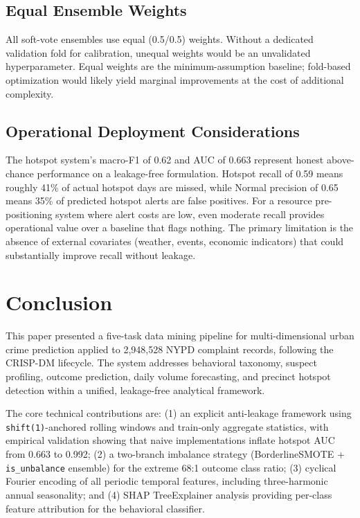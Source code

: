 \documentclass[conference]{IEEEtran}
\begin{document}
\subsection{Equal Ensemble Weights}

All soft-vote ensembles use equal (0.5/0.5) weights. Without a dedicated validation fold for calibration, unequal weights would be an unvalidated hyperparameter. Equal weights are the minimum-assumption baseline; fold-based optimization would likely yield marginal improvements at the cost of additional complexity.

\subsection{Operational Deployment Considerations}

The hotspot system's macro-F1 of 0.62 and AUC of 0.663 represent honest above-chance performance on a leakage-free formulation. Hotspot recall of 0.59 means roughly 41\% of actual hotspot days are missed, while Normal precision of 0.65 means 35\% of predicted hotspot alerts are false positives. For a resource pre-positioning system where alert costs are low, even moderate recall provides operational value over a baseline that flags nothing. The primary limitation is the absence of external covariates (weather, events, economic indicators) that could substantially improve recall without leakage.

\section{Conclusion}
\label{sec:conclusion}

This paper presented a five-task data mining pipeline for multi-dimensional urban crime prediction applied to 2,948,528 NYPD complaint records, following the CRISP-DM lifecycle. The system addresses behavioral taxonomy, suspect profiling, outcome prediction, daily volume forecasting, and precinct hotspot detection within a unified, leakage-free analytical framework.

The core technical contributions are: (1) an explicit anti-leakage framework using \texttt{shift(1)}-anchored rolling windows and train-only aggregate statistics, with empirical validation showing that naive implementations inflate hotspot AUC from 0.663 to 0.992; (2) a two-branch imbalance strategy (BorderlineSMOTE + \texttt{is\_unbalance} ensemble) for the extreme 68:1 outcome class ratio; (3) cyclical Fourier encoding of all periodic temporal features, including three-harmonic annual seasonality; and (4) SHAP TreeExplainer analysis providing per-class feature attribution for the behavioral classifier.
\end{document}
